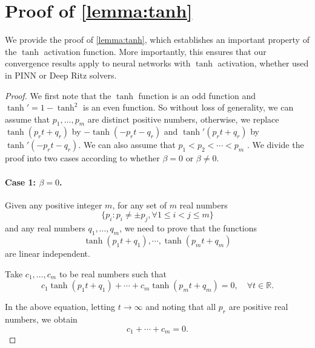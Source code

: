 \documentclass{article}
\begin{document}
\section{Proof of \texorpdfstring{\cref{lemma:tanh}}{Lemma \ref{lemma:tanh}}}\label{sec:proof lemma tanh}
We provide the proof of \cref{lemma:tanh}, which establishes an important property of the $\tanh$ activation function. 
More importantly, this ensures that our convergence results apply to neural networks with $\tanh$ activation, whether used in PINN or Deep Ritz solvers.
\begin{proof}
    We first note that the $\tanh$ function is an odd function and $\tanh'=1-\tanh^2$ is an even function. 
So without loss of generality, we can assume that \(p_1, \ldots, p_m\) are distinct positive numbers, otherwise, we replace $\tanh(p_r t+ q_r) $ by $-\tanh(-p_r t-q_r)$ and $\tanh'(p_r t+ q_r) $ by $\tanh'(-p_r t-q_r)$.
We can also assume that \(p_1 < p_2 < \cdots < p_m\) .
We divide the proof into two cases according to whether $\beta=0$ or $\beta\neq 0$.

    \paragraph{Case 1: $\beta=0$.}

    Given any positive integer $m$, for any set of \(m\) real numbers 
\begin{equation*}   
    \{p_i: p_{i}\neq \pm p_{j}, \forall 1\le i<j\le m\}
\end{equation*}
    and any real numbers \(q_1, \ldots, q_m\), we need to prove that  the functions 
    \begin{equation*}
        \tanh(p_1 t + q_1), \cdots,\tanh(p_m t + q_m) 
    \end{equation*} 
are linear independent.


Take $c_1,\ldots,c_m$ to be real numbers such that 
\begin{equation}
c_1 \tanh(p_1 t + q_1) + \cdots + c_m \tanh(p_m t + q_m) = 0, \quad \forall t \in \mathbb{R}. \label{eq:linear com3}
\end{equation}

In the above equation, letting \( t \to \infty \) and noting that all \( p_r \) are positive real numbers, we obtain 
\begin{equation}
    c_1 + \cdots + c_m = 0 .
    \end{equation}


\end{proof}
\end{document}
